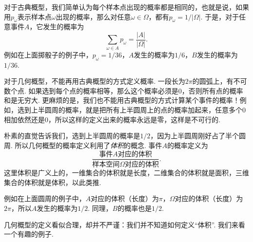 对于古典概型，我们简单认为每个样本点出现的概率都是相同的，也就是说，如果用$p_\omega$表示样本点$\omega$出现的概率，那么对任意$\omega\in\Omega$，都有$p_\omega = 1/|\Omega|$. 于是，对于任意事件$A$，它发生的概率为
\[
    \sum_{\omega\in A} p_\omega = \frac{|A|}{|\Omega|}.
\]
例如在上面掷骰子的例子中，$p_\omega=1/36$，$A$发生的概率为$1/6$，$B$发生的概率为$1/36$.

对于几何概型，不能再用古典概型的方式定义概率. 一段长为$2\pi$的圆弧上，有不可数个点. 如果选到每个点的概率相等，那么这个概率必须是$0$，否则所有点的概率和是无穷大. 更麻烦的是，我们也不能用古典概型的方式计算某个事件的概率！例如，选到上半圆周的概率，就是把所有上半圆周上的点的概率加起来，任意多个$0$相加依然还是$0$，所以这样的定义出来的概率永远是零，这样是不可行的. 

朴素的直觉告诉我们，选到上半圆周的概率是$1/2$，因为上半圆周刚好占了半个圆周. 所以几何概型的概率定义利用了\emph{体积}的概念. 事件$A$的概率定义为
\[
    \frac{\text{事件$A$对应的体积}}{\text{样本空间$\Omega$对应的体积}}.
\]
这里体积是广义上的，一维集合的体积就是长度，二维集合的体积就是面积，三维集合的体积就是体积，以此类推. 

例如在上面圆周的例子中，$A$对应的体积（长度）为$\pi$，$\Omega$对应的体积（长度）为$2\pi$，所以$A$发生的概率为$1/2$. 同理，$B$的概率也是$1/2$.

几何概型的定义看似合理，却并不严谨：我们并不知道如何定义“体积”. 我们来看一个有趣的例子. 

